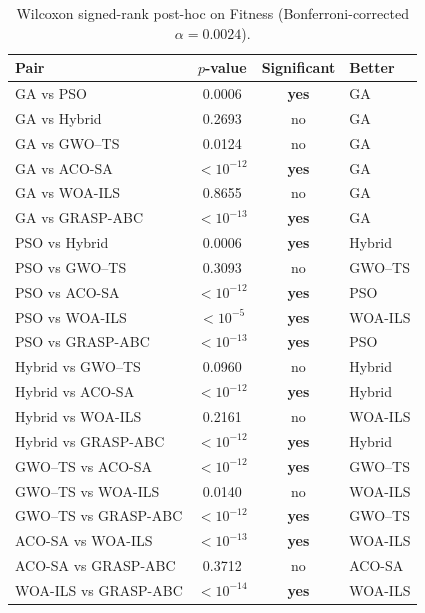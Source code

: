 \begin{table}[t]
  \centering
  \caption{Wilcoxon signed-rank post-hoc on Fitness (Bonferroni-corrected $\alpha = 0.0024$).}
  \label{tab:posthoc_fitness}
  \begin{tabular}{@{}l c c l@{}}
    \toprule
    \textbf{Pair} & \textbf{$p$-value} & \textbf{Significant} & \textbf{Better} \\
    \midrule
    GA vs PSO & 0.0006 & \textbf{yes} & GA \\
    GA vs Hybrid & 0.2693 & no & GA \\
    GA vs GWO--TS & 0.0124 & no & GA \\
    GA vs ACO-SA & $<10^{-12}$ & \textbf{yes} & GA \\
    GA vs WOA-ILS & 0.8655 & no & GA \\
    GA vs GRASP-ABC & $<10^{-13}$ & \textbf{yes} & GA \\
    PSO vs Hybrid & 0.0006 & \textbf{yes} & Hybrid \\
    PSO vs GWO--TS & 0.3093 & no & GWO--TS \\
    PSO vs ACO-SA & $<10^{-12}$ & \textbf{yes} & PSO \\
    PSO vs WOA-ILS & $<10^{-5}$ & \textbf{yes} & WOA-ILS \\
    PSO vs GRASP-ABC & $<10^{-13}$ & \textbf{yes} & PSO \\
    Hybrid vs GWO--TS & 0.0960 & no & Hybrid \\
    Hybrid vs ACO-SA & $<10^{-12}$ & \textbf{yes} & Hybrid \\
    Hybrid vs WOA-ILS & 0.2161 & no & WOA-ILS \\
    Hybrid vs GRASP-ABC & $<10^{-12}$ & \textbf{yes} & Hybrid \\
    GWO--TS vs ACO-SA & $<10^{-12}$ & \textbf{yes} & GWO--TS \\
    GWO--TS vs WOA-ILS & 0.0140 & no & WOA-ILS \\
    GWO--TS vs GRASP-ABC & $<10^{-12}$ & \textbf{yes} & GWO--TS \\
    ACO-SA vs WOA-ILS & $<10^{-13}$ & \textbf{yes} & WOA-ILS \\
    ACO-SA vs GRASP-ABC & 0.3712 & no & ACO-SA \\
    WOA-ILS vs GRASP-ABC & $<10^{-14}$ & \textbf{yes} & WOA-ILS \\
    \bottomrule
  \end{tabular}
\end{table}

